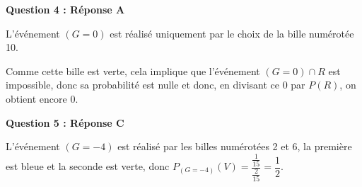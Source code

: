 \documentclass[10pt]{article}
\begin{document}
	\medskip

	\textbf{Question 4 : Réponse A}

	\smallskip

	L'événement $(G=0)$ est réalisé uniquement par le choix de la bille numérotée 10.

	Comme cette bille est verte, cela implique que l'événement $(G = 0) \cap R$ est impossible, donc sa probabilité est nulle et donc, en divisant ce 0 par $P(R)$, on obtient encore 0.

	\medskip

	\textbf{Question 5 : Réponse C}

	L'événement $(G = - 4)$ est réalisé par les billes numérotées 2 et 6, la première est bleue et la seconde est verte, donc $P_{(G =-4)}(V) = \dfrac{\frac{1}{15}}{\frac{2}{15}} = \dfrac{1}{2}$.
\end{document}

